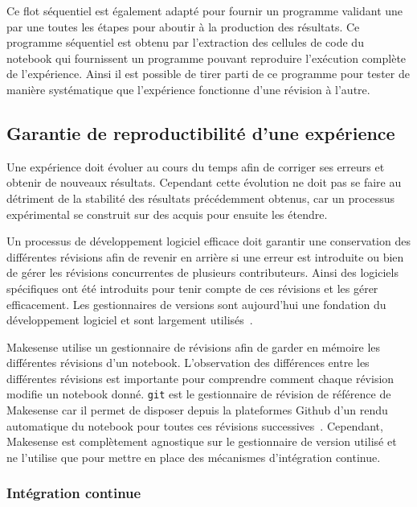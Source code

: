 Ce flot séquentiel est également adapté pour fournir un programme validant une par une toutes les étapes pour aboutir à la production des résultats.
Ce programme séquentiel est obtenu par l'extraction des cellules de code du notebook qui fournissent un programme pouvant reproduire l'exécution complète de l'expérience.
Ainsi il est possible de tirer parti de ce programme pour tester de manière systématique que l'expérience fonctionne d'une révision à l'autre.

\subsection{Garantie de reproductibilité d'une expérience}

Une expérience doit évoluer au cours du temps afin de corriger ses erreurs et obtenir de nouveaux résultats.
Cependant cette évolution ne doit pas se faire au détriment de la stabilité des résultats précédemment obtenus, car un processus expérimental se construit sur des acquis pour ensuite les étendre.

Un processus de développement logiciel efficace doit garantir une conservation des différentes révisions afin de revenir en arrière si une erreur est introduite ou bien de gérer les révisions concurrentes de plusieurs contributeurs.
Ainsi des logiciels spécifiques ont été introduits pour tenir compte de ces révisions et les gérer efficacement.
Les gestionnaires de versions sont aujourd'hui une fondation du développement logiciel et sont largement utilisés~\cite{o2009making}.

Makesense utilise un gestionnaire de révisions afin de garder en mémoire les différentes révisions d'un notebook.
L'observation des différences entre les différentes révisions est importante pour comprendre comment chaque révision modifie un notebook donné.
\texttt{git} est le gestionnaire de révision de référence de Makesense car il permet de disposer depuis la plateformes Github d'un rendu automatique du notebook pour toutes ces révisions successives~\cite{loeliger2012version,dabbish2012social}.
Cependant, Makesense est complètement agnostique sur le gestionnaire de version utilisé et ne l'utilise que pour mettre en place des mécanismes d'intégration continue.

\subsubsection{Intégration continue}
\label{makesense:ci}

